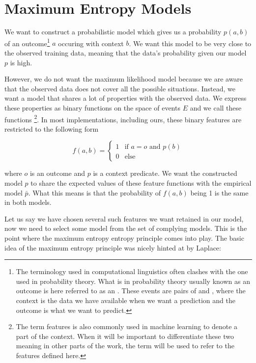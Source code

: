 \chapter{Maximum Entropy Models}
\label{chap:maxent}

We want to construct a probabilistic model which gives us a probability
$p(a,b)$ of an outcome\footnote{The terminology used in computational
linguistics often clashes with the one used in probability theory. What is in
probability theory usually known as an outcome is here referred to as an
. These events are pairs of  and
, where the context is the data we have available when we
want a prediction and the outcome is what we want to predict.} $a$ occuring
with context $b$. We want this model to be very close to the observed training
data, meaning that the data's probability given our model $p$ is high.

However, we do not want the maximum likelihood model because we
are aware that the observed data does not cover all the possible situations.
Instead, we want a model that shares a lot of properties with the observed
data. We express these properties as binary functions on the space of events
$E$ and we call these functions \footnote{The term features
is also commonly used in machine learning to denote a part of the context. When
it will be important to differentiate these two meaning in other parts of the
work, the term  will be used to refer to the
features defined here.}. In most implementations, including ours, these binary
features are restricted to the following form

\begin{equation}
\label{eq:common-feature}
f(a,b) =
\begin{cases}
  1 & \text{if } a=o \text{ and } p(b) \\
  0 & \text{else}
\end{cases}
\end{equation}

where $o$ is an outcome and $p$ is a context predicate. We want the constructed
model $p$ to share the expected values of these feature functions with the
empirical model $\bar{p}$. What this means is that the probability of $f(a,b)$
being 1 is the same in both models.

Let us say we have chosen several such features we want retained in our model,
now we need to select some model from the set of complying models. This is the
point where the maximum entropy entropy principle comes into play. The basic
idea of the maximum entropy principle was nicely hinted at by Laplace:

